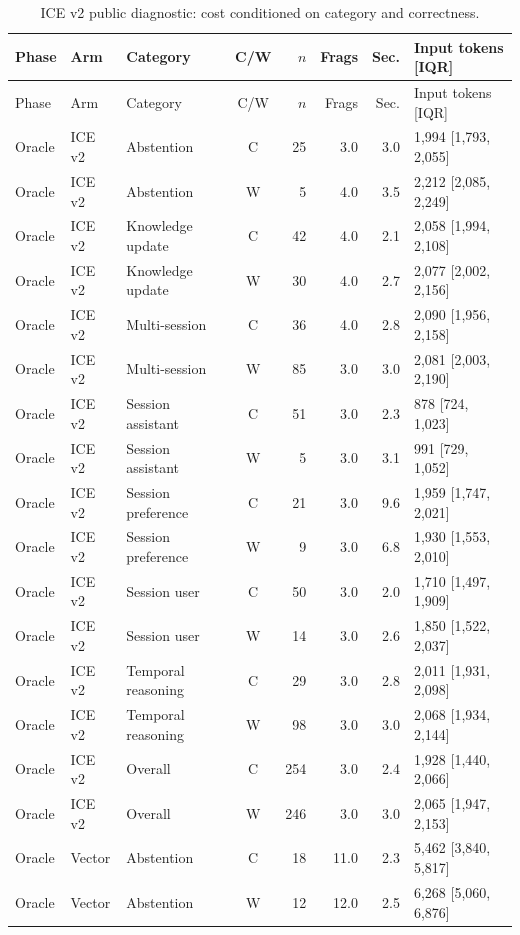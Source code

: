 \documentclass[11pt,a4paper]{article}
\begin{document}
\begin{longtable}{@{}L{1.0cm}L{1.0cm}L{2.6cm}crrrL{3.6cm}@{}}
\caption{ICE v2 public diagnostic: cost conditioned on category and correctness.}\\
\toprule Phase & Arm & Category & C/W & $n$ & Frags & Sec. & Input tokens [IQR]\\\midrule\endfirsthead
\toprule Phase & Arm & Category & C/W & $n$ & Frags & Sec. & Input tokens [IQR]\\\midrule\endhead
Oracle & ICE v2 & Abstention & C & 25 & 3.0 & 3.0 & 1,994 [1,793, 2,055] \\
Oracle & ICE v2 & Abstention & W & 5 & 4.0 & 3.5 & 2,212 [2,085, 2,249] \\
Oracle & ICE v2 & Knowledge update & C & 42 & 4.0 & 2.1 & 2,058 [1,994, 2,108] \\
Oracle & ICE v2 & Knowledge update & W & 30 & 4.0 & 2.7 & 2,077 [2,002, 2,156] \\
Oracle & ICE v2 & Multi-session & C & 36 & 4.0 & 2.8 & 2,090 [1,956, 2,158] \\
Oracle & ICE v2 & Multi-session & W & 85 & 3.0 & 3.0 & 2,081 [2,003, 2,190] \\
Oracle & ICE v2 & Session assistant & C & 51 & 3.0 & 2.3 & 878 [724, 1,023] \\
Oracle & ICE v2 & Session assistant & W & 5 & 3.0 & 3.1 & 991 [729, 1,052] \\
Oracle & ICE v2 & Session preference & C & 21 & 3.0 & 9.6 & 1,959 [1,747, 2,021] \\
Oracle & ICE v2 & Session preference & W & 9 & 3.0 & 6.8 & 1,930 [1,553, 2,010] \\
Oracle & ICE v2 & Session user & C & 50 & 3.0 & 2.0 & 1,710 [1,497, 1,909] \\
Oracle & ICE v2 & Session user & W & 14 & 3.0 & 2.6 & 1,850 [1,522, 2,037] \\
Oracle & ICE v2 & Temporal reasoning & C & 29 & 3.0 & 2.8 & 2,011 [1,931, 2,098] \\
Oracle & ICE v2 & Temporal reasoning & W & 98 & 3.0 & 3.0 & 2,068 [1,934, 2,144] \\
Oracle & ICE v2 & Overall & C & 254 & 3.0 & 2.4 & 1,928 [1,440, 2,066] \\
Oracle & ICE v2 & Overall & W & 246 & 3.0 & 3.0 & 2,065 [1,947, 2,153] \\
Oracle & Vector & Abstention & C & 18 & 11.0 & 2.3 & 5,462 [3,840, 5,817] \\
Oracle & Vector & Abstention & W & 12 & 12.0 & 2.5 & 6,268 [5,060, 6,876] \\

\end{longtable}
\end{document}
